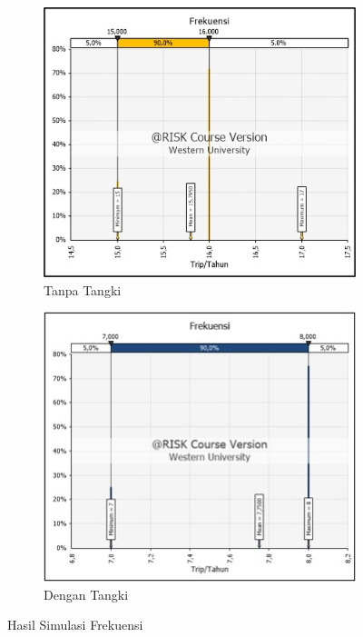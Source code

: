 \begin{figure}[!ht]
    \centering
    \begin{subfigure}{0.4\textwidth}
        \centering
        \includegraphics[width=\textwidth]{grafik/frekuensi-baru.jpg}
        \caption{Tanpa Tangki}
    \end{subfigure}
    \hspace{0.04\textwidth}  %
    \begin{subfigure}{0.4\textwidth}
        \centering
        \includegraphics[width=\textwidth]{grafik/frekuensi-baru-tangki.jpg}
        \caption{Dengan Tangki}    
    \end{subfigure}
    \caption{Hasil Simulasi Frekuensi}
    \label{fig:annual-freq-dist}
\end{figure}

